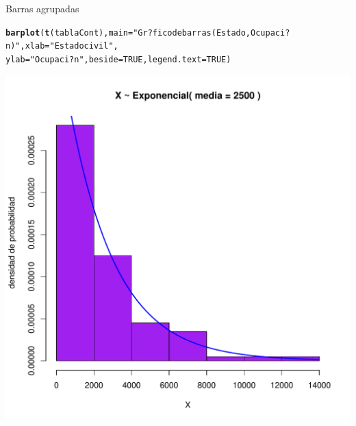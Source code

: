\documentclass[10pt,a4paper]{article}\usepackage[]{graphicx}\usepackage[]{color}
\makeatletter
\def\maxwidth{ %
  \ifdim\Gin@nat@width>\linewidth
    \linewidth
  \else
    \Gin@nat@width
  \fi
}
\newcommand{\hlnum}[1]{\textcolor[rgb]{0.686,0.059,0.569}{#1}}%
\newcommand{\hlstr}[1]{\textcolor[rgb]{0.192,0.494,0.8}{#1}}%
\newcommand{\hlstd}[1]{\textcolor[rgb]{0.345,0.345,0.345}{#1}}%
\newcommand{\hlkwc}[1]{\textcolor[rgb]{0.333,0.667,0.333}{#1}}%
\newcommand{\hlkwd}[1]{\textcolor[rgb]{0.737,0.353,0.396}{\textbf{#1}}}%
\newenvironment{kframe}{%
 \def\at@end@of@kframe{}%
 \ifinner\ifhmode%
  \def\at@end@of@kframe{\end{minipage}}%
  \begin{minipage}{\columnwidth}%
 \fi\fi%
 \def\FrameCommand##1{\hskip\@totalleftmargin \hskip-\fboxsep
 \colorbox{shadecolor}{##1}\hskip-\fboxsep
     \hskip-\linewidth \hskip-\@totalleftmargin \hskip\columnwidth}%
 \MakeFramed {\advance\hsize-\width
   \@totalleftmargin\z@ \linewidth\hsize
   \@setminipage}}%
 {\par\unskip\endMakeFramed%
 \at@end@of@kframe}
\newenvironment{knitrout}{}{} %
\makeatother
\begin{document}
 Barras agrupadas 
\begin{knitrout}
\color{fgcolor}\begin{kframe}
\begin{alltt}
\hlkwd{barplot}\hlstd{(}\hlkwd{t}\hlstd{(tablaCont),} \hlkwc{main}\hlstd{=}\hlstr{"Gr?fico de barras (Estado, Ocupaci?n)"}\hlstd{,} \hlkwc{xlab}\hlstd{=}\hlstr{"Estado civil"}\hlstd{,}
\hlkwc{ylab}\hlstd{=}\hlstr{"Ocupaci?n"}\hlstd{,} \hlkwc{beside}\hlstd{=}\hlnum{TRUE}\hlstd{,} \hlkwc{legend.text}\hlstd{=}\hlnum{TRUE}\hlstd{)}
\end{alltt}
\end{kframe}
\includegraphics[width=\maxwidth]{figure/unnamed-chunk-7-1} 

\end{knitrout}
\end{document}
